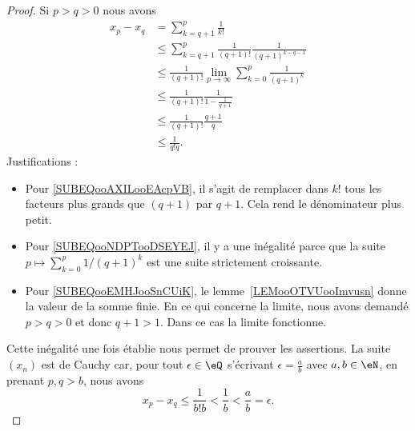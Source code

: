 \begin{proof}
	Si \( p>q>0\) nous avons
	\begin{subequations}
		\begin{align}
			x_p-x_q & =\sum_{k=q+1}^p\frac{1}{ k! }                                                                            \\
			        & \leq \sum_{k=q+1}^p\frac{1}{ (q+1)! }\frac{1}{ (q+1)^{k-q-1} }  \label{SUBEQooAXILooEAcpVB}              \\
			        & \leq \frac{1}{ (q+1)! }\lim_{p\to \infty} \sum_{k=0}^{p}\frac{1}{ (q+1)^k }  \label{SUBEQooNDPTooDSEYEJ} \\
			        & \leq \frac{1}{ (q+1)! }\frac{1}{ 1-\frac{1}{ q+1 } } \label{SUBEQooEMHJooSnCUiK}                         \\
			        & \leq \frac{1}{ (q+1)! }\frac{q+1}{q}                                                                     \\
			        & \leq \frac{1}{ q!q }.
		\end{align}
	\end{subequations}
	Justifications :
	\begin{itemize}
		\item Pour \eqref{SUBEQooAXILooEAcpVB}, il s'agit de remplacer dans \( k!\) tous les facteurs plus grands que \( (q+1)\) par \( q+1\). Cela rend le dénominateur plus petit.
		\item Pour \eqref{SUBEQooNDPTooDSEYEJ}, il y a une inégalité parce que la suite \( p\mapsto \sum_{k=0}^p1/(q+1)^k\) est une suite strictement croissante.

		\item Pour \eqref{SUBEQooEMHJooSnCUiK}, le lemme~\ref{LEMooOTVUooImvusn} donne la valeur de la somme finie. En ce qui concerne la limite, nous avons demandé \( p>q>0\) et donc \( q+1>1\). Dans ce cas la limite fonctionne.
	\end{itemize}

	Cette inégalité une fois établie nous permet de prouver les assertions. La suite \( (x_n) \) est de Cauchy car, pour tout \( \epsilon\in\eQ\) s'écrivant \( \epsilon=\frac{ a }{ b }\) avec \( a,b\in \eN\), en prenant \( p,q>b\), nous avons
	\begin{equation}
		x_p-x_q\leq \frac{1}{ b!b }<\frac{1}{ b }<\frac{ a }{ b }=\epsilon.
	\end{equation}


\end{proof}
